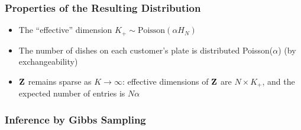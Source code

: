 \documentclass[13pt]{beamer}
\begin{document}
\begin{frame}
\frametitle{Properties of the Resulting Distribution}
\begin{itemize}
\item The ``effective'' dimension $K_+ \sim \text{Poisson}(\alpha H_N)$
\item The number of dishes on each customer's plate is distributed Poisson($\alpha$) (by exchangeability)
\item $\bf{Z}$ remains sparse as $K\rightarrow \infty$: effective dimensions of $\bf{Z}$ are $N \times K_+$, and the expected number of entries is $N\alpha$
\end{itemize}

\end{frame}
\begin{frame}
\frametitle{Inference by Gibbs Sampling}
\end{frame}
\end{document}
